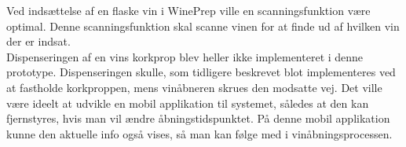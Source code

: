 Ved indsættelse af en flaske vin i WinePrep ville en scanningsfunktion være optimal. Denne scanningsfunktion skal scanne vinen for at finde ud af hvilken vin der er indsat. 
\\
Dispenseringen af en vins korkprop blev heller ikke implementeret i denne prototype. Dispenseringen skulle, som tidligere beskrevet blot implementeres ved at fastholde korkproppen, mens vinåbneren skrues den modsatte vej.
Det ville være ideelt at udvikle en mobil applikation til systemet, således at den kan fjernstyres, hvis man vil ændre åbningstidspunktet. På denne mobil applikation kunne den aktuelle info også vises, så man kan følge med i vinåbningsprocessen.
